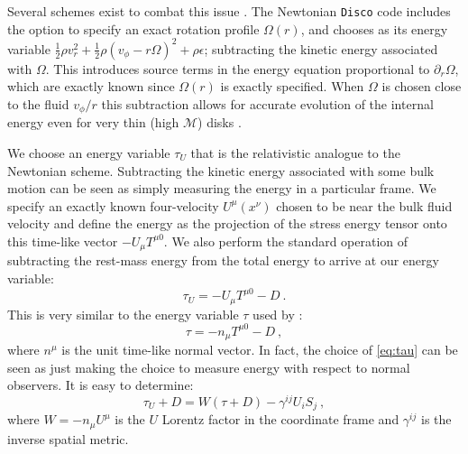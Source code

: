 \documentclass{emulateapj}
\newcommand{\eps}{\epsilon}
\newcommand{\Om}{\Omega}
\newcommand{\Mach}{\mathcal{M}}
\newcommand{\pd}{\partial}
\newcommand{\Disco}{{\texttt{Disco}}}
\begin{document}
Several schemes exist to combat this issue \citep{Masset00}. The Newtonian \Disco{} code includes the option to specify an exact rotation profile $\Om(r)$, and chooses as its energy variable $\frac{1}{2}\rho v_r^2 + \frac{1}{2}\rho(v_\phi-r\Om)^2 + \rho \eps$; subtracting the kinetic energy associated with $\Om$. This introduces source terms in the energy equation proportional to $\pd_r \Om$, which are exactly known since $\Om(r)$ is exactly specified.  When $\Om$ is chosen close to the fluid $v_\phi / r$ this subtraction allows for accurate evolution of the internal energy even for very thin (high $\Mach$) disks \citep{Duffell16}.

We choose an energy variable $\tau_U$ that is the relativistic analogue to the Newtonian scheme.  Subtracting the kinetic energy associated with some bulk motion can be seen as simply measuring the energy in a particular frame. We specify an exactly known four-velocity $U^\mu(x^\nu)$ chosen to be near the bulk fluid velocity and define the energy as the projection of the stress energy tensor onto this time-like vector $-U_\mu T^{\mu 0}$.  We also perform the standard operation of subtracting the rest-mass energy from the total energy to arrive at our energy variable:
\begin{equation}
	\tau_U = -U_\mu T^{\mu 0} - D \ . \label{eq:tauU}
\end{equation}
This is very similar to the energy variable $\tau$ used by \citep{HARM, Duez05}:
\begin{equation}
	\tau = -n_\mu T^{\mu 0} - D \ , \label{eq:tau}
\end{equation}
where $n^\mu$ is the unit time-like normal vector. In fact, the choice of \eqref{eq:tau} can be seen as just making the choice to measure energy with respect to normal observers.  It is easy to determine: %
\begin{equation}
\tau_U + D = W\left(\tau + D\right) - \gamma^{ij}U_i S_j  \ ,
\end{equation}
where $W = -n_\mu U^\mu$ is the $U$ Lorentz factor in the coordinate frame and $\gamma^{ij}$ is the inverse spatial metric.
\end{document}
